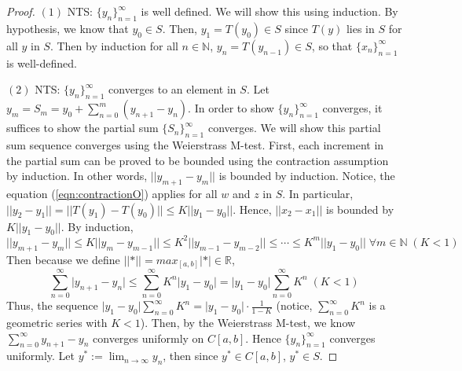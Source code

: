\documentclass{article}
\theoremstyle{definition}
\theoremstyle{remark}
\begin{document}
\begin{proof}
    $(1)$ NTS: $\{y_n\}_{n = 1}^{\infty}$ is well defined. \; We will show this using induction. By hypothesis, we know that $y_0 \in S$. Then, $y_1 = T(y_0) \in S$ since $T(y)$ lies in $S$ for all $y$ in $S$. Then by induction for all $n \in \mathbb{N}$, $y_n = T(y_{n-1}) \in S$, so that $\{x_n\}_{n = 1}^{\infty}$ is well-defined.
    
    $(2)$ NTS: $\{y_n\}_{n = 1}^{\infty}$ converges to an element in $S$. \; Let $y_m = S_m = y_0 + \sum_{n = 0}^{m}(y_{n+1} - y_n)$. In order to show $\{y_n\}_{n = 1}^{\infty}$ converges, it suffices to show the partial sum $\{S_n\}_{n = 1}^{\infty}$ converges. We will show this partial sum sequence converges using the Weierstrass M-test. First, each increment in the partial sum can be proved to be bounded using the contraction assumption by induction. In other words, $\lvert\lvert y_{m+1} - y_{m}\rvert\rvert$ is bounded by induction. Notice, the equation (\ref{eqn:contractionO}) applies for all $w$ and $z$ in $S$. In particular, $\lvert\lvert y_2 - y_1 \rvert\rvert = \lvert\lvert T(y_1) - T(y_0) \rvert\rvert \leq K \lvert\lvert y_1 - y_0 \rvert\rvert$. Hence, $\lvert\lvert x_2 - x_1 \rvert\rvert$ is bounded by $K \lvert\lvert y_1 - y_0 \rvert\rvert$. By induction,
    \begin{equation}
        \lvert\lvert y_{m+1} - y_{m} \rvert\rvert \leq K \lvert\lvert y_m - y_{m-1} \rvert\rvert \leq K^2 \lvert\lvert y_{m-1} - y_{m-2} \rvert\rvert \leq \cdots \leq K^m\lvert\lvert y_1 - y_0 \rvert\rvert \; \forall m \in \mathbb{N} \; (K < 1)
    \end{equation}
   Then because we define $\lvert\lvert * \rvert\rvert = max_{[a,b]}\lvert * \rvert \in \mathbb{R}$,
    \begin{equation}\label{eqn:comparison}
        \sum_{n = 0}^{\infty}{\lvert y_{n+1} - y_n \rvert} \leq \sum_{n = 0}^{\infty}{K^n\lvert y_1 - y_0 \rvert} = \lvert y_1 - y_0 \rvert \sum_{n = 0}^{\infty}{K^n} \; (K < 1)
    \end{equation}
    Thus, the sequence $\lvert y_1 - y_0 \rvert \sum_{n = 0}^{\infty}{K^n} = \lvert y_1 - y_0 \rvert \cdot \tfrac{1}{1-K}$ (notice, $\sum_{n = 0}^{\infty}{K^n}$ is a geometric series with $K < 1$). Then, by the Weierstrass M-test, we know $\sum_{n = 0}^{\infty}{y_{n+1} - y_n}$ converges uniformly on $C[a,b]$. Hence $\{y_n\}_{n = 1}^{\infty}$ converges uniformly. Let $y^{*} := \lim_{n \to \infty}{y_n}$, then since $y^{*} \in C[a,b]$, $y^{*} \in S$.
    

\end{proof}
\end{document}
